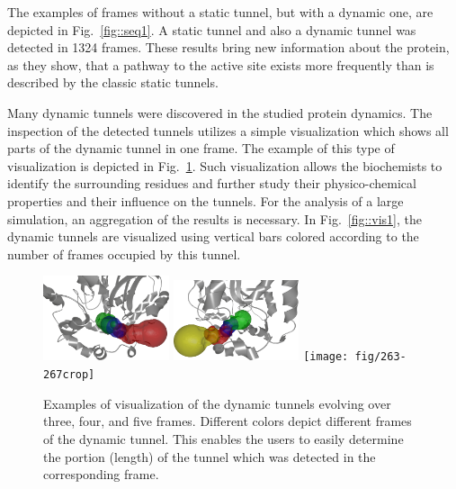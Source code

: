 \documentclass[usletter, 10pt, conference]{svjour3}      %
\begin{document}
The examples of frames without a static tunnel, but with a dynamic one, are depicted in Fig.~\ref{fig::seq1}.
A static tunnel and also a dynamic tunnel was detected in 1324 frames.
These results bring new information about the protein, as they show, that a pathway to the active site exists more
frequently than is described by the classic static tunnels.



Many dynamic tunnels were discovered in the studied protein dynamics.
The inspection of the detected tunnels utilizes a simple visualization which shows all parts of the dynamic tunnel in one frame.
The example of this type of visualization is depicted in Fig.~\ref{fig::joint}.
Such visualization allows the biochemists to identify the surrounding residues and further study their physico-chemical properties and their influence on the tunnels.
For the analysis of a large simulation, an aggregation of the results is necessary.
In Fig.~\ref{fig::vis1}, the dynamic tunnels are visualized using vertical bars colored according to the number of frames occupied by this tunnel.


   
    
\begin{figure}
\centering
\includegraphics[width=0.33\textwidth]{fig/58-60crop}
\includegraphics[width=0.33\textwidth]{fig/280-283crop}
\texttt{[image: fig/263-267crop]}
\caption{\label{fig::joint}
Examples of visualization of the dynamic tunnels evolving over three, four, and five frames. Different colors depict different frames of the dynamic tunnel. This enables the users to easily determine the portion (length) of the tunnel which was detected in the corresponding frame. 
}
\end{figure}
\end{document}
